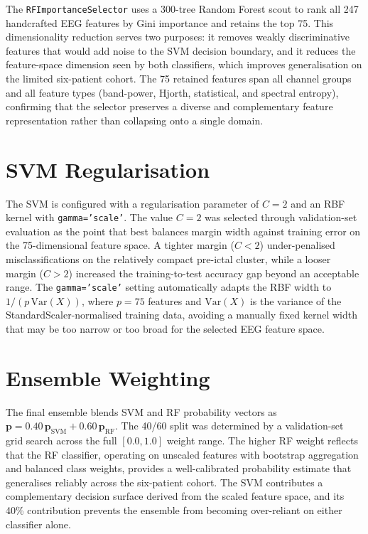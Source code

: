 \documentclass[12pt, a4paper]{report}
\begin{document}
The \texttt{RFImportanceSelector} uses a 300-tree Random Forest scout to
rank all 247 handcrafted EEG features by Gini importance and retains the
top 75. This dimensionality reduction serves two purposes: it removes
weakly discriminative features that would add noise to the SVM decision
boundary, and it reduces the feature-space dimension seen by both
classifiers, which improves generalisation on the limited six-patient
cohort. The 75 retained features span all channel groups and all feature
types (band-power, Hjorth, statistical, and spectral entropy), confirming
that the selector preserves a diverse and complementary feature
representation rather than collapsing onto a single domain.

\section{SVM Regularisation}
\label{sec:svm_reg_results}

The SVM is configured with a regularisation parameter of $C=2$ and an RBF
kernel with \texttt{gamma='scale'}. The value $C=2$ was selected through
validation-set evaluation as the point that best balances margin width
against training error on the 75-dimensional feature space. A tighter
margin ($C<2$) under-penalised misclassifications on the relatively compact
pre-ictal cluster, while a looser margin ($C>2$) increased the
training-to-test accuracy gap beyond an acceptable range. The
\texttt{gamma='scale'} setting automatically adapts the RBF width to
$1/(p\,\mathrm{Var}(X))$, where $p=75$ features and $\mathrm{Var}(X)$ is
the variance of the StandardScaler-normalised training data, avoiding a
manually fixed kernel width that may be too narrow or too broad for the
selected EEG feature space.

\section{Ensemble Weighting}
\label{sec:ensemble_results}

The final ensemble blends SVM and RF probability vectors as
$\mathbf{p} = 0.40\,\mathbf{p}_{\text{SVM}} + 0.60\,\mathbf{p}_{\text{RF}}$.
The 40/60 split was determined by a validation-set grid search across the
full $[0.0, 1.0]$ weight range. The higher RF weight reflects that the RF
classifier, operating on unscaled features with bootstrap aggregation and
balanced class weights, provides a well-calibrated probability estimate
that generalises reliably across the six-patient cohort. The SVM
contributes a complementary decision surface derived from the scaled
feature space, and its 40\% contribution prevents the ensemble from
becoming over-reliant on either classifier alone.
\end{document}
